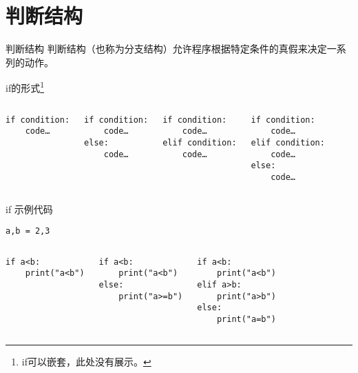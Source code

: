 \documentclass{beamer}
\begin{document}
\section{判断结构}
\begin{frame}[fragile]{判断结构}
判断结构（也称为分支结构）允许程序根据特定条件的真假来决定一系列的动作。
\begin{block}{if的形式\footnote{if可以嵌套，此处没有展示。}}
\begin{columns}
\begin{Verbatim}[numbers=none,frame=single,rulecolor=\color{red}]
if condition:
    code…
\end{Verbatim}
\begin{Verbatim}[numbers=none,frame=single,rulecolor=\color{red}]
if condition:
    code…
else:
    code…
\end{Verbatim}
\begin{Verbatim}[numbers=none,frame=single,rulecolor=\color{red}]
if condition:
    code…
elif condition:
    code…
\end{Verbatim}
\begin{Verbatim}[numbers=none,frame=single,rulecolor=\color{red}]
if condition:
    code…
elif condition:
    code…
else:
    code…
\end{Verbatim}
\end{columns}

\end{block}
\end{frame}
\begin{frame}[fragile]{if 示例代码}
\begin{Verbatim}[numbers=none,frame=single,rulecolor=\color{red}]
a,b = 2,3
\end{Verbatim}
\begin{columns}
\begin{Verbatim}[numbers=none,frame=single,rulecolor=\color{red}]
if a<b:
    print("a<b")
    \end{Verbatim}
\begin{Verbatim}[numbers=none,frame=single,rulecolor=\color{red}]
if a<b:
    print("a<b")
else:
    print("a>=b")
\end{Verbatim}
\begin{Verbatim}[numbers=none,frame=single,rulecolor=\color{red}]
if a<b:
    print("a<b")
elif a>b:
    print("a>b")
else:
    print("a=b")
\end{Verbatim}
\end{columns}
\end{frame}
\end{document}
